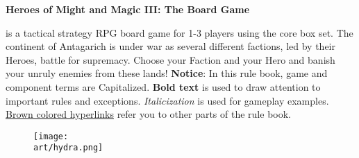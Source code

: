 
\bigbreak

\hypertarget{Heroes of Might and Magic III}{\textbf{Heroes of Might and Magic III: The Board Game}} is a tactical strategy RPG board game for 1-3 players using the core box set.
The continent of Antagarich is under war as several different factions, led by their Heroes, battle for supremacy. Choose your Faction and your Hero and banish your unruly enemies from these lands!
\bigbreak
\textbf{Notice}: In this rule book, game and component terms are Capitalized.
\textbf{Bold text} is used to draw attention to important rules and exceptions.
\textit{Italicization} is used for gameplay examples.
\hyperlink{Heroes of Might and Magic III}{Brown colored hyperlinks} refer you to other parts of the rule book.
\vfill
\begin{figure}[hb]
  \centering
  \texttt{[image: \\art/hydra.png]}
\end{figure}
\vfill
